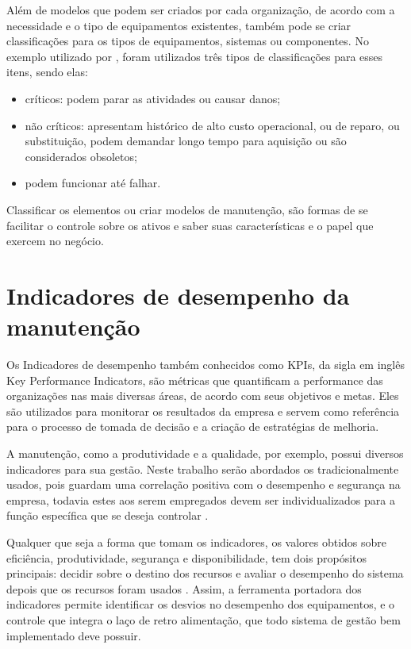 Além de modelos que podem ser criados por cada organização, de acordo com a necessidade e o tipo de equipamentos existentes, também pode se criar classificações para os tipos de equipamentos, sistemas ou componentes. No exemplo utilizado por \cite{valeria2013}, foram utilizados três tipos de classificações para esses itens, sendo elas:

\begin{itemize}
	\item críticos: podem parar as atividades ou causar danos;
	\item não críticos: apresentam histórico de alto custo operacional, ou de reparo, ou substituição, podem demandar longo tempo para aquisição ou são considerados obsoletos;
	\item podem funcionar até falhar.
\end{itemize}

Classificar os elementos ou criar modelos de manutenção, são formas de se facilitar o controle sobre os ativos e saber suas características e o papel que exercem no negócio.

\section{Indicadores de desempenho da manutenção}

Os Indicadores de desempenho também conhecidos como KPIs, da sigla em inglês Key Performance Indicators, são métricas que quantificam a performance das organizações nas mais diversas áreas, de acordo com seus objetivos e metas. Eles são utilizados para monitorar os resultados da empresa e servem como referência para o processo de tomada de decisão e a criação de estratégias de melhoria. 

A manutenção, como a produtividade e a qualidade, por exemplo, possui diversos indicadores para sua gestão. Neste trabalho serão abordados os tradicionalmente usados, pois guardam uma correlação positiva com o desempenho e segurança na empresa, todavia estes aos serem empregados devem ser individualizados para a função específica que se deseja controlar \cite{martorell1999}. 

Qualquer que seja a forma que tomam os indicadores, os valores obtidos sobre eficiência, produtividade, segurança e disponibilidade, tem dois propósitos principais: decidir sobre o destino dos recursos e avaliar o desempenho do sistema depois que os recursos foram usados \cite{lofsten1998}. Assim, a ferramenta portadora dos indicadores permite identificar os desvios no desempenho dos equipamentos, e o controle que integra o laço de retro alimentação, que todo sistema de gestão bem implementado deve possuir. 

